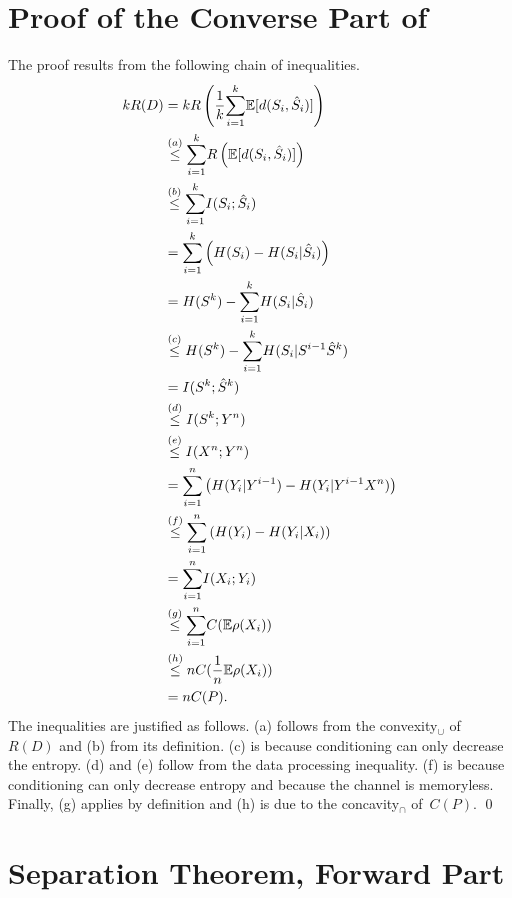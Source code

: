 \begin{subappendices}

\section{Proof of the Converse Part of }
\label{app:separationproof}

The proof results from the following chain of inequalities.
{\allowdisplaybreaks
\begin{align*}
  kR(D) &= k R\left(\frac1k {\sum_{i=1}^k} \mathbb{E}[d(S_i, {\hat{S}}_i)] \right) \\
  &\stackrel{(a)}{\le} {\sum_{i=1}^k} R\left(\mathbb{E}[d(S_i, {\hat{S}}_i)] \right) \\
  &\stackrel{(b)}{\le} {\sum_{i=1}^k} I(S_i; {\hat{S}}_i) \\
  &= {\sum_{i=1}^k} \left( H(S_i) - H(S_i|{\hat{S}}_i)  \right)\\
  &= H(S^k) - {\sum_{i=1}^k} H(S_i|{\hat{S}}_i) \\
  &\stackrel{(c)}{\le} H(S^k) - {\sum_{i=1}^k} H(S_i|S^{i-1} {\hat{S}}^k) \\
  &=I(S^k;{\hat{S}}^k) \\
  &\stackrel{(d)}{\le} I(S^k; Y^n) \\
  &\stackrel{(e)}{\le} I(X^n; Y^n) \\
  &= {\sum_{i=1}^n} \left( H(Y_i|Y^{i-1}) - H(Y_i|Y^{i-1} X^n) \right)  \\
  &\stackrel{(f)}{\le} {\sum_{i=1}^n} \left( H(Y_i) - H(Y_i|X_i) \right) \\
  &= {\sum_{i=1}^n} I(X_i; Y_i) \\
  &\stackrel{(g)}{\le} {\sum_{i=1}^n} C(\mathbb{E} \rho(X_i)) \\
  &\stackrel{(h)}{\le} n C(\frac1n \mathbb{E} \rho(X_i)) \\
  &= n C(P).
\end{align*}}%
The inequalities are justified as follows. (a) follows from the convexity$_\cup$
of~$R(D)$ and (b) from its definition. (c) is because
conditioning can only decrease the entropy. (d) and (e) follow from the data
processing inequality. (f) is because conditioning can only decrease entropy and
because the channel is memoryless. Finally, (g) applies by definition and (h) is
due to the concavity$_\cap$ of~$C(P)$.  \hfil\qed


\section{Separation Theorem, Forward Part}\label{app:separationforward}


\end{subappendices}
